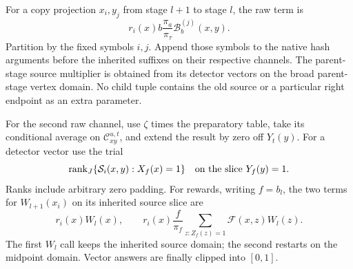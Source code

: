 For a copy projection $x_i,y_j$ from stage $l+1$ to stage $l$, the raw term
is
\begin{equation}
 r_i(x)b\frac{\pi_a}{\pi_\tau}\mathcal B_b^{(j)}(x,y).
 \label{eq:est-projection}
\end{equation}
Partition by the fixed symbols $i,j$.  Append those symbols to the native
hash arguments before the inherited suffixes on their respective channels.
The parent-stage source multiplier is obtained from its detector vectors
on the broad parent-stage vertex domain.  No child tuple contains the old
source or a particular right endpoint as an extra parameter.

For the second raw channel, use $\zeta$ times the preparatory table, take
its conditional average on $\mathcal C_{xy}^{u,t}$, and extend the result
by zero off $Y_t(y)$.  For a detector vector use the trial
\begin{equation}
 \operatorname{rank}_{J}
       \{\mathcal S_i(x,y):X_f(x)=1\}
 \quad\hbox{on the slice }Y_f(y)=1.
 \label{eq:est-detector}
\end{equation}
Ranks include arbitrary zero padding.  For rewards, writing $f=b_l$, the
two terms for $W_{l+1}(x_i)$ on its inherited source slice are
\begin{equation}
 r_i(x)W_l(x),\qquad
 r_i(x)\frac f{\pi_f}
       \sum_{z:Z_f(z)=1}\mathcal F(x,z)W_l(z).
 \label{eq:est-reward}
\end{equation}
The first $W_l$ call keeps the inherited source domain; the second restarts
on the midpoint domain.  Vector answers are finally clipped into $[0,1]$.


